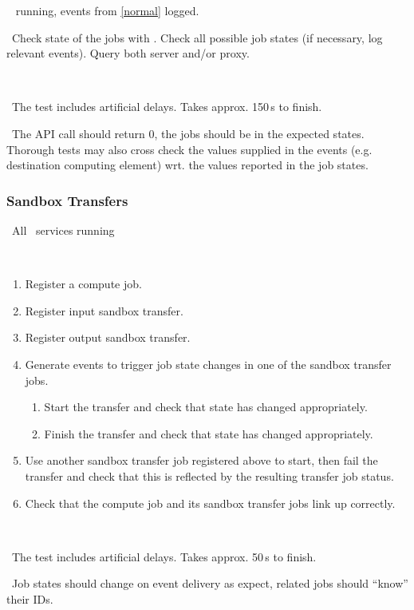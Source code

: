 \req\  running, events from \ref{normal} logged.

\what\ Check state of the jobs with . Check all possible job states 
(if necessary, log relevant events). Query both server and/or proxy.

\how\ 

\note\ The test includes artificial delays. Takes approx. 150\,s to finish.

\result\ The API call should return 0, the jobs should be in the expected
states. Thorough tests may also cross check the values supplied in the
events (e.g. destination computing element) wrt. the values reported in the job states.


\subsubsection{Sandbox Transfers}

\req\ All \LB\ services running

\what\
\begin{enumerate}
\item Register a compute job.
\item Register input sandbox transfer.
\item Register output sandbox transfer.
\item Generate events to trigger job state changes in one of the sandbox transfer jobs.
	\begin{enumerate}
        \item Start the transfer and check that state has changed appropriately.
        \item Finish the transfer and check that state has changed appropriately. 
	\end{enumerate}
\item Use another sandbox transfer job registered above to start, then fail the transfer and check that this is reflected by the resulting transfer job status. 
\item Check that the compute job and its sandbox transfer jobs link up correctly. 

\end{enumerate}

\how\ 

\note\ The test includes artificial delays. Takes approx. 50\,s to finish.

\result\ Job states should change on event delivery as expect, related jobs should ``know'' their IDs.





